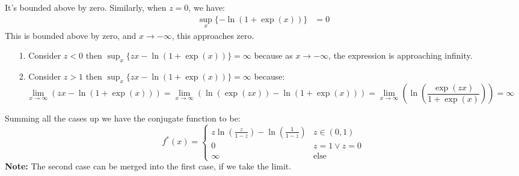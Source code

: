 \documentclass[]{article}
\begin{document}
        It's bounded above by zero. 
        Similarly, when $z = 0$, we have: 
        \begin{align*}\tag{1d4}\label{eqn:1d4}
            \sup_x \{-\ln(1 + \exp(x))\} & = 0
        \end{align*}
        This is bounded above by zero, and $x\rightarrow-\infty$, this approaches zero. 
        \begin{enumerate}
        \item[1.] Consider $z < 0$ then $\sup_x\{zx - \ln(1 + \exp(x))\} = \infty$ because as $x\rightarrow -\infty$, the expression is approaching infinity. 
        \item[2.] Consider $z > 1$ then $\sup_x\{zx - \ln(1 + \exp(x))\} = \infty$ because: 
        \begin{equation*}\tag{1d5}\label{eqn:1d5}
            \lim_{x\rightarrow\infty}
            \left(
                zx - \ln(1 + \exp(x))
            \right)
            =
            \lim_{x\rightarrow\infty}
            \left(
                \ln(\exp(zx)) - \ln(1 + \exp(x))
            \right)
            =
            \lim_{x\rightarrow\infty}
            \left(
                \ln
                \left(
                    \frac{\exp(zx)}{1 + \exp(x)}
                \right)
            \right) = \infty
        \end{equation*} 
        \end{enumerate}
        Summing all the cases up we have the conjugate function to be: 
        \begin{equation*}\tag{1d6}\label{eqn:1d6}
            f^*(x) = 
            \begin{cases}
                z \ln \left(
                    \frac{z}{1 - z}
                \right)
                -
                \ln \left(
                    \frac{1}{1 - z} 
                \right) & z \in (0, 1)
                \\
                0 & z = 1 \vee z = 0
                \\
                \infty & \text{else}
            \end{cases}
        \end{equation*}
        \textbf{Note:} The second case can be merged into the first case, if we take the limit. 
        
\end{document}
